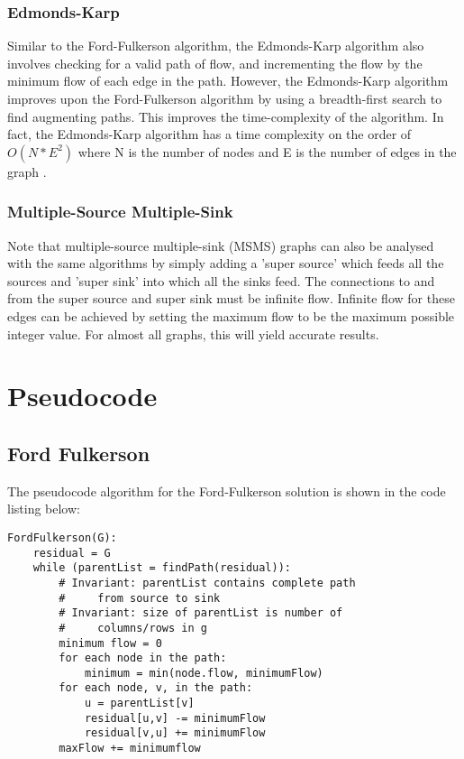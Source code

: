 \documentclass[12pt]{report}
\begin{document}
\subsubsection*{Edmonds-Karp}

Similar to the Ford-Fulkerson algorithm, the Edmonds-Karp algorithm also involves checking for a valid path of flow, and incrementing the flow by the minimum flow of each edge in the path. However, the Edmonds-Karp algorithm improves upon the Ford-Fulkerson algorithm by using a breadth-first search to find augmenting paths. This improves the time-complexity of the algorithm. In fact, the Edmonds-Karp algorithm has a time complexity on the order of $O(N*E^2)$ where N is the number of nodes and E is the number of edges in the graph \cite{illinois}.

\subsubsection*{Multiple-Source Multiple-Sink}
Note that multiple-source multiple-sink (MSMS) graphs can also be analysed with the same algorithms by simply adding a 'super source' which feeds all the sources and 'super sink' into which all the sinks feed. The connections to and from the super source and super sink must be infinite flow. Infinite flow for these edges can be achieved by setting the maximum flow to be the maximum possible integer value. For almost all graphs, this will yield accurate results.

\section*{Pseudocode}

\subsection*{Ford Fulkerson}

The pseudocode algorithm for the Ford-Fulkerson solution is shown in the code listing below:

\begin{lstlisting}[frame=single]
FordFulkerson(G):
	residual = G
	while (parentList = findPath(residual)):
		# Invariant: parentList contains complete path 
		#     from source to sink
		# Invariant: size of parentList is number of 
		#     columns/rows in g
		minimum flow = 0
		for each node in the path:
			minimum = min(node.flow, minimumFlow)
		for each node, v, in the path:
			u = parentList[v]
			residual[u,v] -= minimumFlow
			residual[v,u] += minimumFlow
		maxFlow += minimumflow
\end{lstlisting}
 
\end{document}
